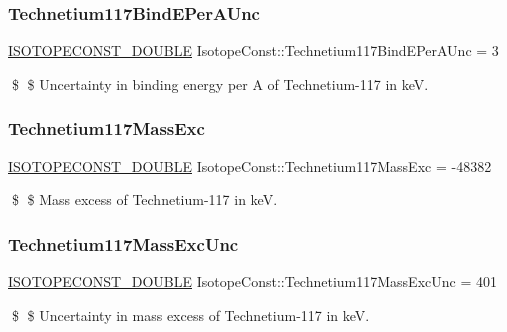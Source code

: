 \subsubsection{\texorpdfstring{Technetium117\+Bind\+E\+Per\+A\+Unc}{Technetium117BindEPerAUnc}}
{\footnotesize\ttfamily \mbox{\hyperlink{group___isotope_const-_macros_ga8f45a7272ce02c0b4c65c44636ed719a}{I\+S\+O\+T\+O\+P\+E\+C\+O\+N\+S\+T\+\_\+\+D\+O\+U\+B\+LE}} Isotope\+Const\+::\+Technetium117\+Bind\+E\+Per\+A\+Unc = 3}

\$ \$ Uncertainty in binding energy per A of Technetium-\/117 in keV. \mbox{\label{group___isotope_const-_technetium-_tc117_ga3fededbb2a623a4c87f8795bcb5a6c59}} 
\subsubsection{\texorpdfstring{Technetium117\+Mass\+Exc}{Technetium117MassExc}}
{\footnotesize\ttfamily \mbox{\hyperlink{group___isotope_const-_macros_ga8f45a7272ce02c0b4c65c44636ed719a}{I\+S\+O\+T\+O\+P\+E\+C\+O\+N\+S\+T\+\_\+\+D\+O\+U\+B\+LE}} Isotope\+Const\+::\+Technetium117\+Mass\+Exc = -\/48382}

\$ \$ Mass excess of Technetium-\/117 in keV. \mbox{\label{group___isotope_const-_technetium-_tc117_ga6fc219d2bb465ff5b8bac66f3e7c2cc9}} 
\subsubsection{\texorpdfstring{Technetium117\+Mass\+Exc\+Unc}{Technetium117MassExcUnc}}
{\footnotesize\ttfamily \mbox{\hyperlink{group___isotope_const-_macros_ga8f45a7272ce02c0b4c65c44636ed719a}{I\+S\+O\+T\+O\+P\+E\+C\+O\+N\+S\+T\+\_\+\+D\+O\+U\+B\+LE}} Isotope\+Const\+::\+Technetium117\+Mass\+Exc\+Unc = 401}

\$ \$ Uncertainty in mass excess of Technetium-\/117 in keV. \mbox{\label{group___isotope_const-_technetium-_tc117_gafc4ae8e6143844485e4111dcf3596d56}} 
